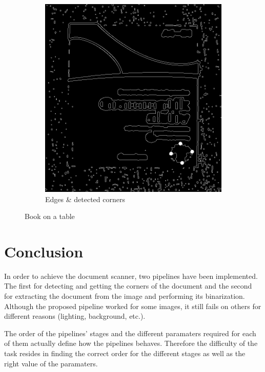 \documentclass{scrartcl}
\begin{document}
\begin{figure}[!htbp]
\begin{subfigure}[b]{0.3\textwidth}
      \includegraphics[width=\textwidth]{pictures/results/reference4/edge-detector.png}
      \caption{Edges \& detected corners}
    \end{subfigure}
    \caption{Book on a table}
    \label{figure:book-on-table}
  \end{figure}

  \section{Conclusion}

  In order to achieve the document scanner, two pipelines have been implemented. The first
  for detecting and getting the corners of the document and the second for extracting the
  document from the image and performing its binarization. Although the proposed pipeline
  worked for some images, it still fails on others for different reasons (lighting,
  background, etc.).

  The order of the pipelines' stages and the different paramaters required for each of them 
  actually define how the pipelines behaves. Therefore the difficulty of the task resides
  in finding the correct order for the different stages as well as the right value of the
  paramaters.
\end{document}
